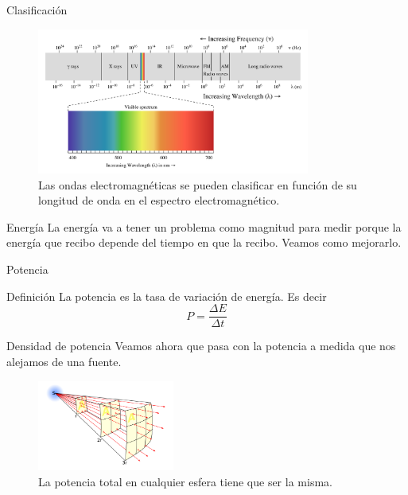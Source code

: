 \documentclass[handout]{beamer}
\begin{document}
\begin{frame}{Clasificación}
  \begin{figure}
    \includegraphics[width=0.8\textwidth]{imagenes/espectrum.png}
    \caption{Las ondas electromagnéticas se pueden clasificar en función de su longitud de onda en el espectro electromagnético. }
  \end{figure}
\end{frame}

\begin{frame}{Energía}
  La energía va a tener un problema como magnitud para medir porque la energía que recibo depende del tiempo en que la recibo. Veamos como mejorarlo.
\end{frame}

\begin{frame}{Potencia}
  \begin{block}{Definición}
    La potencia es la tasa de variación de energía. Es decir
    \begin{equation}
      P = \frac{\Delta E}{\Delta t}
    \end{equation}
  \end{block}
\end{frame}


\begin{frame}{Densidad de potencia}
  Veamos ahora que pasa con la potencia a medida que nos alejamos de una fuente.
  \begin{figure}
    \includegraphics[width=0.4\textwidth]{imagenes/inversesquare.png}
    \caption{La potencia total en cualquier esfera tiene que ser la misma. }
  \end{figure}
\end{frame}
\end{document}
